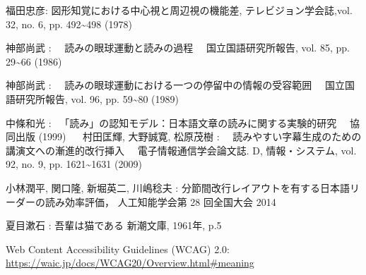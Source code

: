 
\begin{bib}[100]

\begin{thebibliography}{}

  福田忠彦: 
    \newblock 図形知覚における中心視と周辺視の機能差, 
    \newblock テレビジョン学会誌,vol. 32, no. 6, pp. 492\textasciitilde498 (1978)

    神部尚武 :
     　\newblock 読みの眼球運動と読みの過程
     　\newblock 国立国語研究所報告, vol. 85, pp. 29\textasciitilde66 (1986)

  神部尚武 :
   　\newblock 読みの眼球運動における一つの停留中の情報の受容範囲
   　\newblock 国立国語研究所報告, vol. 96, pp. 59\textasciitilde80 (1989)

  中條和光 :
 　\newblock 「読み」の認知モデル：日本語文章の読みに関する実験的研究
 　\newblock 協同出版 (1999)
  　
  村田匡輝, 大野誠寛, 松原茂樹 :
  　\newblock 読みやすい字幕生成のための講演文への漸進的改行挿入
  　\newblock 電子情報通信学会論文誌. D, 情報・システム, vol. 92, no. 9, pp. 1621\textasciitilde1631 (2009)

  小林潤平, 関口隆, 新堀英二, 川嶋稔夫 :
    \newblock 分節間改行レイアウトを有する日本語リーダーの読み効率評価，
    \newblock 人工知能学会第 28 回全国大会 2014

  夏目漱石 :
  \newblock 吾輩は猫である
  \newblock 新潮文庫, 1961年, p.5

  \newblock Web Content Accessibility Guidelines (WCAG) 2.0:
  \newblock \protect\url{https://waic.jp/docs/WCAG20/Overview.html#meaning}

\end{thebibliography}

\end{bib}
